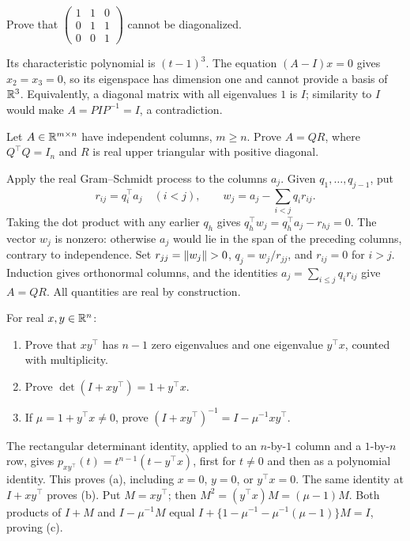 \begin{problem}\label{ex:08:three-jordan}
Prove that \(\begin{pmatrix}1&1&0\\0&1&1\\0&0&1\end{pmatrix}\)
cannot be diagonalized.
\end{problem}
\begin{solution}
Its characteristic polynomial is \((t-1)^3\).
The equation \((A-I)x=0\) gives \(x_2=x_3=0\), so its eigenspace
has dimension one and cannot provide a basis of \(\mathbb R^3\).
Equivalently, a diagonal matrix with all eigenvalues \(1\) is \(I\);
similarity to \(I\) would make \(A=PIP^{-1}=I\), a contradiction.
\end{solution}

\begin{problem}\label{ex:08:qr}
Let \(A\in\mathbb R^{m\times n}\) have independent columns, \(m\geqslant n\).
Prove \(A=QR\), where \(Q^\top Q=I_n\) and \(R\) is real upper
triangular with positive diagonal.
\end{problem}
\begin{solution}
Apply the real Gram--Schmidt process to the columns \(a_j\).
Given \(q_1,\ldots,q_{j-1}\), put
\[
 r_{ij}=q_i^\top a_j\quad(i<j),\qquad
 w_j=a_j-\sum_{i<j}q_ir_{ij}.
\]
Taking the dot product with any earlier \(q_h\) gives
\(q_h^\top w_j=q_h^\top a_j-r_{hj}=0\).
The vector \(w_j\) is nonzero: otherwise \(a_j\) would lie in the span
of the preceding columns, contrary to independence.
Set \(r_{jj}=\left\lVert w_j\right\rVert>0\), \(q_j=w_j/r_{jj}\), and \(r_{ij}=0\) for
\(i>j\). Induction gives orthonormal columns, and the identities
\(a_j=\sum_{i\leqslant j}q_ir_{ij}\) give \(A=QR\).
All quantities are real by construction.
\end{solution}

\begin{problem}\label{ex:08:rank-one}
For real \(x,y\in\mathbb R^n\):
\begin{enumerate}
\item Prove that \(xy^\top\) has \(n-1\) zero eigenvalues and one
eigenvalue \(y^\top x\), counted with multiplicity.
\item Prove \(\det(I+xy^\top)=1+y^\top x\).
\item If \(\mu=1+y^\top x\ne0\), prove
\((I+xy^\top)^{-1}=I-\mu^{-1}xy^\top\).
\end{enumerate}
\end{problem}
\begin{solution}
The rectangular determinant identity, applied to an \(n\)-by-\(1\)
column and a \(1\)-by-\(n\) row, gives
\(p_{xy^\top}(t)=t^{n-1}(t-y^\top x)\), first for \(t\ne0\) and then
as a polynomial identity. This proves (a), including \(x=0\), \(y=0\),
or \(y^\top x=0\).
The same identity at \(I+xy^\top\) proves (b).
Put \(M=xy^\top\); then \(M^2=(y^\top x)M=(\mu-1)M\).
Both products of \(I+M\) and \(I-\mu^{-1}M\) equal
\(I+\{1-\mu^{-1}-\mu^{-1}(\mu-1)\}M=I\), proving (c).
\end{solution}


